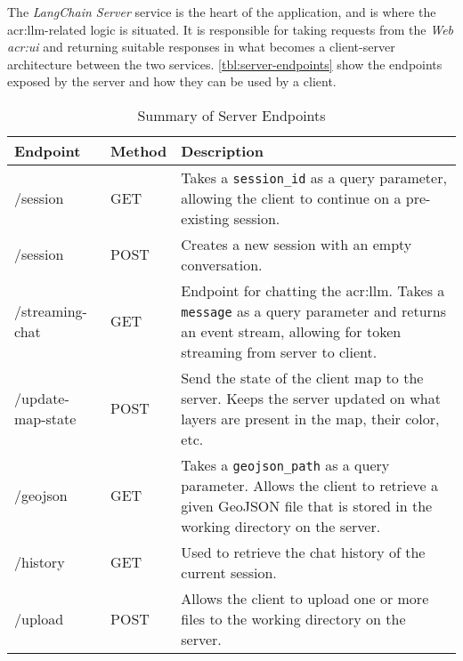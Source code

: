The \textit{LangChain Server} service is the heart of the application, and is where the \gls{acr:llm}-related logic is situated. It is responsible for taking requests from the \textit{Web \acrshort{acr:ui}} and returning suitable responses in what becomes a client-server architecture between the two services. \autoref{tbl:server-endpoints} show the endpoints exposed by the server and how they can be used by a client.

\begin{table}[h]
    \centering
    \caption{Summary of Server Endpoints}
    \label{tbl:server-endpoints}
    \begin{tabular}{p{}p{}p{}}
        \toprule
        \textbf{Endpoint} & \textbf{Method} & \textbf{Description}                                                                                                                                                         \\
        \midrule
        /session          & GET             & Takes a \texttt{session\_id} as a query parameter, allowing the client to continue on a pre-existing session.                                                                \\
        /session          & POST            & Creates a new session with an empty conversation.                                                                                                                            \\
        /streaming-chat   & GET             & Endpoint for chatting the \acrshort{acr:llm}. Takes a \texttt{message} as a query parameter and returns an event stream, allowing for token streaming from server to client. \\
        /update-map-state & POST            & Send the state of the client map to the server. Keeps the server updated on what layers are present in the map, their color, etc.                                            \\
        /geojson          & GET             & Takes a \texttt{geojson\_path} as a query parameter. Allows the client to retrieve a given GeoJSON file that is stored in the working directory on the server.               \\
        /history          & GET             & Used to retrieve the chat history of the current session.                                                                                                                    \\
        /upload           & POST            & Allows the client to upload one or more files to the working directory on the server.                                                                                        \\
        \bottomrule
    \end{tabular}
\end{table}

